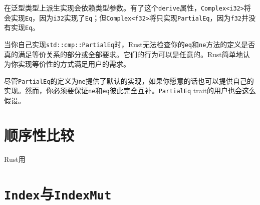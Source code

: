 在泛型类型上派生实现会依赖类型参数。有了这个\texttt{derive}属性，\texttt{Complex<i32>}将会实现\texttt{Eq}，因为\texttt{i32}实现了\texttt{Eq}；但\texttt{Complex<f32>}将只实现\texttt{PartialEq}，因为\texttt{f32}并没有实现\texttt{Eq}。

当你自己实现\texttt{std::cmp::PartialEq}时，Rust无法检查你的\texttt{eq}和\texttt{ne}方法的定义是否真的满足等价关系的部分或全部要求。它们的行为可以是任意的。Rust简单地认为你实现等价性的方式满足用户的需求。

尽管\texttt{PartialEq}的定义为\texttt{ne}提供了默认的实现，如果你愿意的话也可以提供自己的实现。然而，你必须要保证\texttt{ne}和\texttt{eq}彼此完全互补。\texttt{PartialEq} trait的用户也会这么假设。

\section{顺序性比较}\label{cmp}

Rust用

\section{\texttt{Index}与\texttt{IndexMut}}\label{index}

